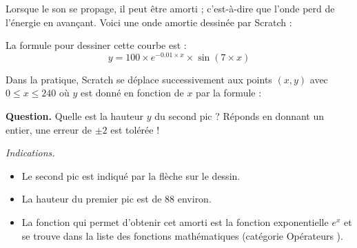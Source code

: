 \documentclass[class=report,crop=false, 12pt]{standalone}
\begin{document}
\begin{enigme}

Lorsque le son se propage, il peut être amorti ; c'est-à-dire que l'onde perd de l'énergie en avançant. Voici une onde amortie dessinée par Scratch :
%


La formule pour dessiner cette courbe est :
$$y = 100 \times e^{-0.01 \times x} \times \sin(7 \times x)$$

Dans la pratique, Scratch se déplace successivement aux points $(x,y)$ avec $0 \le x \le 240$ où $y$ est donné en fonction de $x$  par la formule :


\begin{center}
\end{center}



\textbf{Question.} Quelle est la hauteur $y$ du second pic ? Réponds en donnant un entier, une erreur de $\pm2$ est tolérée !
\bigskip



\emph{Indications.} 
\begin{itemize}
  \item Le second pic est indiqué par la flèche sur le dessin.
  \item La hauteur du premier pic est de $88$ environ.
  \item La fonction qui permet d'obtenir cet amorti est la fonction exponentielle $e^x$ et se trouve dans la liste des fonctions mathématiques (catégorie \og{}Opérateurs \fg{}).
\end{itemize}



\end{enigme}
\end{document}
